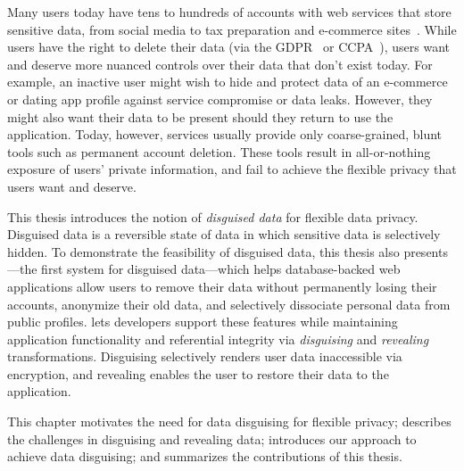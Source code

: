 Many users today have tens to hundreds of accounts with web services that store
sensitive data, from social media to tax preparation and e-commerce
sites~\cite{tens,hundreds,password_life_cycle}.
%
While users have the right to delete their data (via \eg the
GDPR~\cite{eu:gdpr} or CCPA~\cite{ccpa}), users want and deserve more nuanced
controls over their data that don't exist today.
%
For example, an inactive user might wish to hide and protect data of an e-commerce or
dating app profile against service compromise or data leaks. However, they might also want their data to be present should they return to use the application. 
%
Today, however, services usually provide only coarse-grained, blunt tools such
as permanent account deletion.
These tools result in all-or-nothing exposure of users' private information, and
fail to achieve the flexible privacy that users want and deserve.
%

%
This thesis introduces the notion of \emph{disguised data} for flexible data
privacy. Disguised data is a reversible state of data in which sensitive data is
selectively hidden.
%
To demonstrate the feasibility of disguised data, this thesis also presents
\sys---the first system for disguised data---which helps database-backed web applications allow users
to remove their data without permanently losing their accounts, anonymize their
old data, and selectively dissociate personal data from public profiles.
%
\sys lets developers support these features while maintaining application
functionality and referential integrity via \emph{disguising} and \emph{revealing}
transformations.
%
Disguising selectively renders user data inaccessible via encryption, and
revealing enables the user to restore their data to the application.
%
%

%
This chapter motivates the need for data disguising for flexible privacy;
describes the challenges in disguising and revealing data; introduces our
approach to achieve data disguising; and summarizes the contributions of this
thesis.

